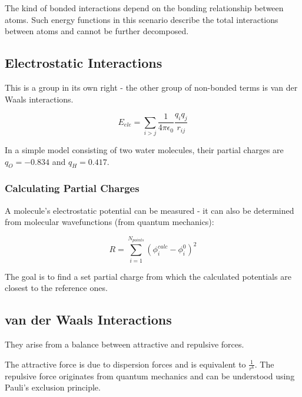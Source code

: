 \documentclass[
  letterpaper,
  DIV=11,
  numbers=noendperiod]{scrreprt}
\begin{document}
The kind of bonded interactions depend on the bonding relationship
between atoms. Such energy functions in this scenario describe the total
interactions between atoms and cannot be further decomposed.

\hypertarget{electrostatic-interactions}{%
\subsection{Electrostatic
Interactions}\label{electrostatic-interactions}}

This is a group in its own right - the other group of non-bonded terms
is van der Waals interactions.

\begin{equation}
  E_{ele} = \sum_{i > j}\frac{1}{4\pi\epsilon_0}\frac{q_iq_j}{r_{ij}}
\end{equation}

In a simple model consisting of two water molecules, their partial
charges are \(q_O = -0.834\) and \(q_H = 0.417\).

\hypertarget{calculating-partial-charges}{%
\subsubsection{Calculating Partial
Charges}\label{calculating-partial-charges}}

A molecule's electrostatic potential can be measured - it can also be
determined from molecular wavefunctions (from quantum mechanics):

\begin{equation}
  R = \sum_{i = 1}^{N_{points}}(\phi_i^{calc} - \phi_i^0)^2
\end{equation}

The goal is to find a set partial charge from which the calculated
potentials are closest to the reference ones.

\hypertarget{van-der-waals-interactions}{%
\subsection{van der Waals
Interactions}\label{van-der-waals-interactions}}

They arise from a balance between attractive and repulsive forces.

The attractive force is due to dispersion forces and is equivalent to
\(\displaystyle \frac{1}{r^6}\). The repulsive force originates from
quantum mechanics and can be understood using Pauli's exclusion
principle.
\end{document}
